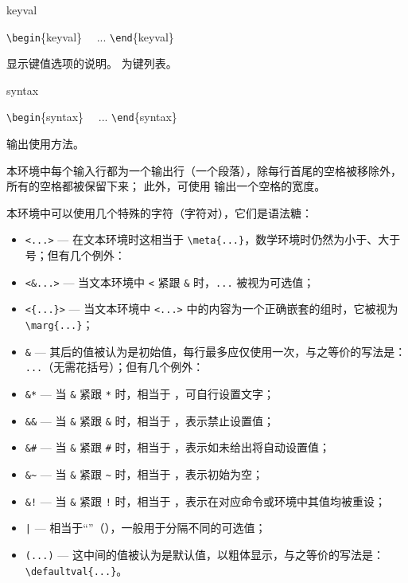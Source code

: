 \documentclass[twoside]{book}
\begin{document}
\begin{function}[type=environment]{keyval}
\begin{syntax}
  \verb|\begin|\{keyval\}  
  ~~... 
  \verb|\end|\{keyval\}
\end{syntax}
显示键值选项的说明。 为键列表。
\end{function}

\begin{function}[type=environment]{syntax}
\begin{syntax}
  \verb|\begin|\{syntax\}
  ~~... 
  \verb|\end|\{syntax\}
\end{syntax}
输出使用方法。

本环境中每个输入行都为一个输出行（一个段落），除每行首尾的空格被移除外，所有的空格都被保留下来；
此外，可使用 \V{~} 输出一个空格的宽度。
\end{function}

本环境中可以使用几个特殊的字符（字符对），它们是语法糖：
\begin{itemize}[nosep]
  \item \verb|<...>| --- 在文本环境时这相当于 \verb|\meta{...}|，数学环境时仍然为小于、大于号；但有几个例外：
  \item \verb|<&...>| --- 当文本环境中 \verb|<| 紧跟 \verb|&| 时，\verb|...| 被视为可选值；
  \item \verb|<{...}>| --- 当文本环境中 \verb|<...>| 中的内容为一个正确嵌套的组时，它被视为 \verb|\marg{...}|；
  \item \verb|&| --- 其后的值被认为是初始值，每行最多应仅使用一次，与之等价的写法是： \verb| ...|（无需花括号）；但有几个例外：
  \item \verb|&*| --- 当 \verb|&| 紧跟 \verb|*| 时，相当于 ，可自行设置文字；
  \item \verb|&&| --- 当 \verb|&| 紧跟 \verb|&| 时，相当于 ，表示禁止设置值；
  \item \verb|&#| --- 当 \verb|&| 紧跟 \verb|#| 时，相当于 ，表示如未给出将自动设置值；
  \item \verb|&~| --- 当 \verb|&| 紧跟 \verb|~| 时，相当于 ，表示初始为空；
  \item \verb|&!| --- 当 \verb|&| 紧跟 \verb|!| 时，相当于 ，表示在对应命令或环境中其值均被重设；
  \item \verb+|+ --- 相当于“\orbar”（），一般用于分隔不同的可选值；
  \item \verb|(...)| --- 这中间的值被认为是默认值，以粗体显示，与之等价的写法是：\\ \verb|\defaultval{...}|。
\end{itemize}
\end{document}
